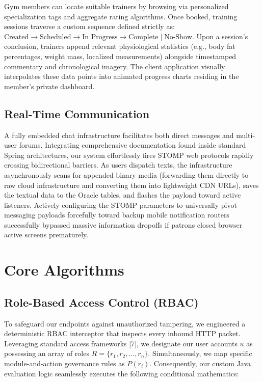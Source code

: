 Gym members can locate suitable trainers by browsing via personalized
specialization tags and aggregate rating algorithms. Once booked,
training sessions traverse a custom sequence defined strictly as:
\(\text{Created} \rightarrow \text{Scheduled} \rightarrow \text{In Progress} \rightarrow \text{Complete} \mid \text{No-Show}\).
Upon a session's conclusion, trainers append relevant physiological
statistics (e.g., body fat percentages, weight mass, localized
measurements) alongside timestamped commentary and chronological
imagery. The client application visually interpolates these data points
into animated progress charts residing in the member's private
dashboard.

\subsection{Real-Time Communication}\label{real-time-communication}

A fully embedded chat infrastructure facilitates both direct messages
and multi-user forums. Integrating comprehensive documentation found
inside standard Spring architectures, our system effortlessly fires
STOMP web protocols rapidly crossing bidirectional barriers. As users
dispatch texts, the infrastructure asynchronously scans for appended
binary media (forwarding them directly to raw cloud infrastructure and
converting them into lightweight CDN URLs), saves the textual data to
the Oracle tables, and flashes the payload toward active listeners.
Actively configuring the STOMP parameters to universally pivot messaging
payloads forcefully toward backup mobile notification routers
successfully bypassed massive information dropoffs if patrons closed
browser active screens prematurely.

\section{Core Algorithms}\label{core-algorithms}

\subsection{Role-Based Access Control
(RBAC)}\label{role-based-access-control-rbac}

To safeguard our endpoints against unauthorized tampering, we engineered
a deterministic RBAC interceptor that inspects every inbound HTTP
packet. Leveraging standard access frameworks {[}7{]}, we designate our
user accounts \(u\) as possessing an array of roles
\(R = \{r_1, r_2, \ldots, r_n\}\). Simultaneously, we map specific
module-and-action governance rules as \(P(r_i)\). Consequently, our
custom Java evaluation logic seamlessly executes the following
conditional mathematics:

